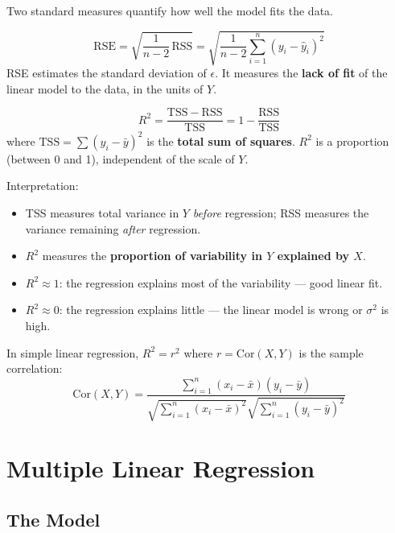 \documentclass[11pt,a4paper]{article}
\theoremstyle{definition}
\theoremstyle{plain}
\theoremstyle{remark}
\begin{document}
Two standard measures quantify how well the model fits the data.

\begin{tcolorbox}[colback=blue!5!white,colframe=blue!75!black,title=\textbf{Residual Standard Error (RSE)}]
\[
    \mathrm{RSE} = \sqrt{\frac{1}{n-2}\,\mathrm{RSS}} = \sqrt{\frac{1}{n-2}\sum_{i=1}^{n}(y_i - \hat{y}_i)^2}
\]
RSE estimates the standard deviation of $\epsilon$. It measures the \textbf{lack of fit} of the linear model to the data, in the units of $Y$.
\end{tcolorbox}

\begin{tcolorbox}[colback=blue!5!white,colframe=blue!75!black,title=\textbf{$R^2$ Statistic}]
\[
    R^2 = \frac{\mathrm{TSS} - \mathrm{RSS}}{\mathrm{TSS}} = 1 - \frac{\mathrm{RSS}}{\mathrm{TSS}}
\]
where $\mathrm{TSS} = \sum(y_i - \bar{y})^2$ is the \textbf{total sum of squares}. $R^2$ is a proportion (between 0 and 1), independent of the scale of $Y$.
\end{tcolorbox}

Interpretation:
\begin{itemize}
    \item TSS measures total variance in $Y$ \textit{before} regression; RSS measures the variance remaining \textit{after} regression.
    \item $R^2$ measures the \textbf{proportion of variability in $Y$ explained by $X$}.
    \item $R^2 \approx 1$: the regression explains most of the variability — good linear fit.
    \item $R^2 \approx 0$: the regression explains little — the linear model is wrong or $\sigma^2$ is high.
\end{itemize}

In simple linear regression, $R^2 = r^2$ where $r = \mathrm{Cor}(X, Y)$ is the sample correlation:
\[
    \mathrm{Cor}(X, Y) = \frac{\sum_{i=1}^{n}(x_i - \bar{x})(y_i - \bar{y})}{\sqrt{\sum_{i=1}^{n}(x_i - \bar{x})^2}\sqrt{\sum_{i=1}^{n}(y_i - \bar{y})^2}}
\]


\section{Multiple Linear Regression}

\subsection{The Model}
\end{document}
